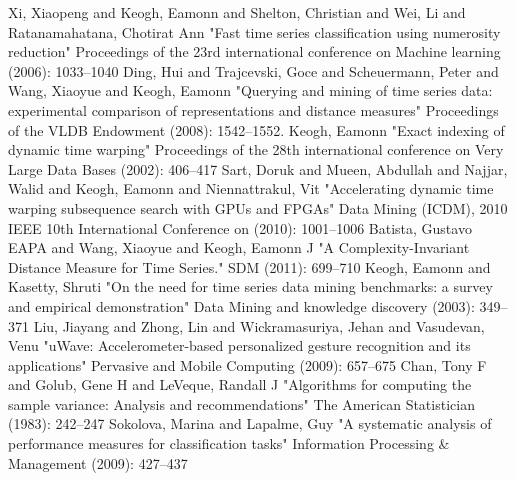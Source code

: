 \begin{thebibliography}{1}
     Xi, Xiaopeng and Keogh, Eamonn and Shelton, Christian and Wei, Li and Ratanamahatana, Chotirat
    Ann "Fast time series classification using numerosity reduction" Proceedings of the 23rd international conference on
    Machine learning (2006): 1033--1040
     Ding, Hui and Trajcevski, Goce and Scheuermann, Peter and Wang, Xiaoyue and Keogh, Eamonn
    "Querying and mining of time series data: experimental comparison of representations and distance measures"
    Proceedings of the VLDB Endowment (2008): 1542--1552.
     Keogh, Eamonn "Exact indexing of dynamic time warping" Proceedings of the 28th
    international conference on Very Large Data Bases (2002): 406--417
     Sart, Doruk and Mueen, Abdullah and Najjar, Walid and Keogh, Eamonn and
    Niennattrakul, Vit "Accelerating dynamic time warping subsequence search with GPUs and FPGAs" Data Mining (ICDM),
    2010 IEEE 10th International Conference on (2010): 1001--1006
     Batista, Gustavo EAPA and Wang, Xiaoyue and Keogh, Eamonn J "A
    Complexity-Invariant Distance Measure for Time Series." SDM (2011): 699--710
     Keogh, Eamonn and Kasetty, Shruti "On the need for time series data mining benchmarks: a
    survey and empirical demonstration" Data Mining and knowledge discovery (2003): 349--371
     Liu, Jiayang and Zhong, Lin and Wickramasuriya, Jehan and Vasudevan, Venu "uWave:
    Accelerometer-based personalized gesture recognition and its applications" Pervasive and Mobile Computing
    (2009): 657--675
     Chan, Tony F and Golub, Gene H and LeVeque, Randall J "Algorithms for computing the
    sample variance: Analysis and recommendations" The American Statistician (1983): 242--247
     Sokolova, Marina and Lapalme, Guy "A systematic analysis of performance measures
    for classification tasks" Information Processing \& Management (2009): 427--437
\end{thebibliography}

